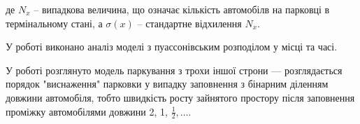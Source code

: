 де $N_{x}$ -- випадкова величина, що означає кількість автомобілв на парковці в термінальному стані, а $\sigma(x)$ -- стандартне відхилення $N_{x}$.

У роботі \cite{coffman1998parking} виконано аналіз моделі з пуассонівським розподілом у місці та часі.

У роботі \cite{exhaustion2017mackey} розглянуто модель паркування з трохи іншої строни --- розглядається порядок "виснаження" парковки у випадку заповнення з бінарним діленням довжини автомобіля, тобто швидкість росту зайнятого простору після заповнення проміжку автомобілями довжини 2, 1, $\frac{1}{2}, \dots$.



